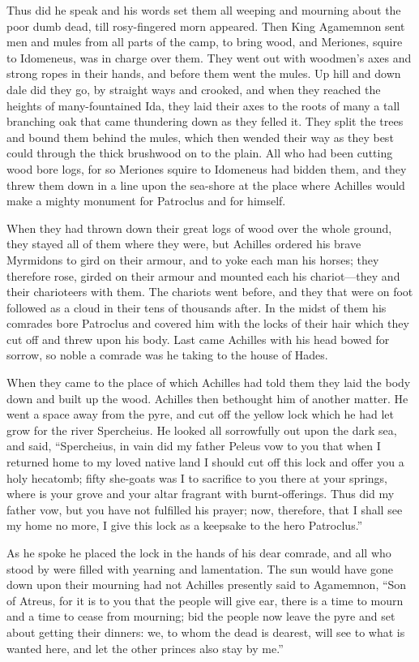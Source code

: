 Thus did he speak and his words set them all weeping and mourning about
the poor dumb dead, till rosy-fingered morn appeared. Then King Agamemnon
sent men and mules from all parts of the camp, to bring wood, and
Meriones, squire to Idomeneus, was in charge over them. They went out with
woodmen’s axes and strong ropes in their hands, and before them went the
mules. Up hill and down dale did they go, by straight ways and crooked,
and when they reached the heights of many-fountained Ida, they laid their
axes to the roots of many a tall branching oak that came thundering down
as they felled it. They split the trees and bound them behind the mules,
which then wended their way as they best could through the thick brushwood
on to the plain. All who had been cutting wood bore logs, for so Meriones
squire to Idomeneus had bidden them, and they threw them down in a line
upon the sea-shore at the place where Achilles would make a mighty monument
for Patroclus and for himself.

When they had thrown down their great logs of wood over the whole ground,
they stayed all of them where they were, but Achilles ordered his brave
Myrmidons to gird on their armour, and to yoke each man his horses; they
therefore rose, girded on their armour and mounted each his chariot—they
and their charioteers with them. The chariots went before, and they that
were on foot followed as a cloud in their tens of thousands after. In the
midst of them his comrades bore Patroclus and covered him with the locks
of their hair which they cut off and threw upon his body. Last came
Achilles with his head bowed for sorrow, so noble a comrade was he taking
to the house of Hades.

When they came to the place of which Achilles had told them they laid the
body down and built up the wood. Achilles then bethought him of another
matter. He went a space away from the pyre, and cut off the yellow lock
which he had let grow for the river Spercheius. He looked all sorrowfully
out upon the dark sea, and said, “Spercheius, in vain did my father Peleus
vow to you that when I returned home to my loved native land I should cut
off this lock and offer you a holy hecatomb; fifty she-goats was I to
sacrifice to you there at your springs, where is your grove and your altar
fragrant with burnt-offerings. Thus did my father vow, but you have not
fulfilled his prayer; now, therefore, that I shall see my home no more, I
give this lock as a keepsake to the hero Patroclus.”

As he spoke he placed the lock in the hands of his dear comrade, and all
who stood by were filled with yearning and lamentation. The sun would have
gone down upon their mourning had not Achilles presently said to
Agamemnon, “Son of Atreus, for it is to you that the people will give ear,
there is a time to mourn and a time to cease from mourning; bid the people
now leave the pyre and set about getting their dinners: we, to whom the
dead is dearest, will see to what is wanted here, and let the other
princes also stay by me.”

